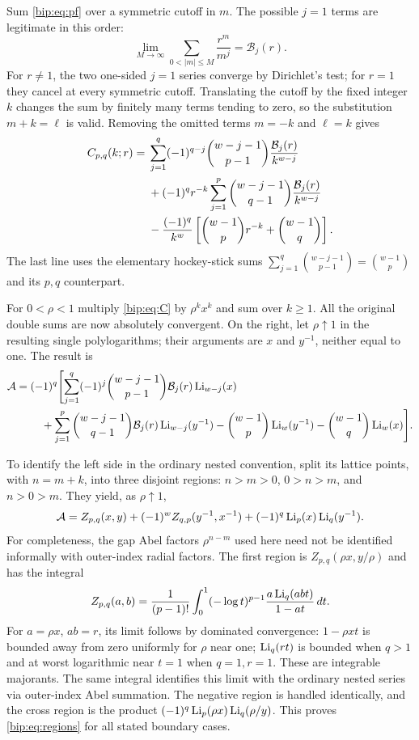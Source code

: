 Sum \eqref{bip:eq:pf} over a symmetric cutoff in $m$.  The possible
$j=1$ terms are legitimate in this order:
\[
 \underset{M\to\infty}{\lim}\sum_{0<|m|\le M}\frac{r^m}{m^j}
      =\mathcal B_j(r).
\]
For $r\ne1$, the two one-sided $j=1$ series converge by Dirichlet's
test; for $r=1$ they cancel at every symmetric cutoff.  Translating
the cutoff by the fixed integer $k$ changes the sum by finitely many
terms tending to zero, so the substitution $m+k=\ell$ is valid.
Removing the omitted terms $m=-k$ and $\ell=k$ gives
\begin{align}
 C_{p,q}(k;r)={}&
 \sum_{j=1}^q(-1)^{q-j}\binom{w-j-1}{p-1}
   \frac{\mathcal B_j(r)}{k^{w-j}}\notag\\
 &+(-1)^qr^{-k}\sum_{j=1}^p\binom{w-j-1}{q-1}
   \frac{\mathcal B_j(r)}{k^{w-j}}\notag\\
 &-\frac{(-1)^q}{k^w}
       \left[\binom{w-1}{p}r^{-k}+\binom{w-1}{q}\right].
 \label{bip:eq:C}
\end{align}
The last line uses the elementary hockey-stick sums
$\sum_{j=1}^q\binom{w-j-1}{p-1}=\binom{w-1}{p}$ and its
$p,q$ counterpart.

For $0<\rho<1$ multiply \eqref{bip:eq:C} by $\rho^kx^k$ and sum over
$k\ge1$. All the original double sums are now absolutely convergent.
On the right, let $\rho\uparrow1$ in the resulting single
polylogarithms; their arguments are $x$ and $y^{-1}$, neither equal
to one.  The result is
\begin{align}
 \mathcal A={}&(-1)^q\Biggl[
 \sum_{j=1}^q(-1)^j\binom{w-j-1}{p-1}
       \mathcal B_j(r)\operatorname{Li}_{w-j}(x)\notag\\
 &\quad+\sum_{j=1}^p\binom{w-j-1}{q-1}
       \mathcal B_j(r)\operatorname{Li}_{w-j}(y^{-1})
       -\binom{w-1}{p}\operatorname{Li}_w(y^{-1})
       -\binom{w-1}{q}\operatorname{Li}_w(x)\Biggr].
 \label{bip:eq:A}
\end{align}

To identify the left side in the ordinary nested convention, split
its lattice points, with $n=m+k$, into three disjoint regions:
$n>m>0$, $0>n>m$, and $n>0>m$. They yield, as $\rho\uparrow1$,
\begin{equation}
 \mathcal A=Z_{p,q}(x,y)+(-1)^wZ_{q,p}(y^{-1},x^{-1})
            +(-1)^q\operatorname{Li}_p(x)\operatorname{Li}_q(y^{-1}).
 \label{bip:eq:regions}
\end{equation}
For completeness, the gap Abel factors $\rho^{n-m}$ used here need
not be identified informally with outer-index radial factors.  The
first region is $Z_{p,q}(\rho x,y/\rho)$ and has the integral
\begin{equation}
 Z_{p,q}(a,b)=\frac1{(p-1)!}
    \int_0^1(-\log t)^{p-1}
            \frac{a\operatorname{Li}_q(abt)}{1-at}\,dt.
 \label{bip:eq:integral}
\end{equation}
For $a=\rho x$, $ab=r$, its limit follows by dominated convergence:
$1-\rho xt$ is bounded away from zero uniformly for $\rho$ near one;
$\operatorname{Li}_q(rt)$ is bounded when $q>1$ and at worst logarithmic near
$t=1$ when $q=1,r=1$.  These are integrable majorants.  The same
integral identifies this limit with the ordinary nested series via
outer-index Abel summation.  The negative region is handled
identically, and the cross region is the product
$(-1)^q\operatorname{Li}_p(\rho x)\operatorname{Li}_q(\rho/y)$.  This proves
\eqref{bip:eq:regions} for all stated boundary cases.

